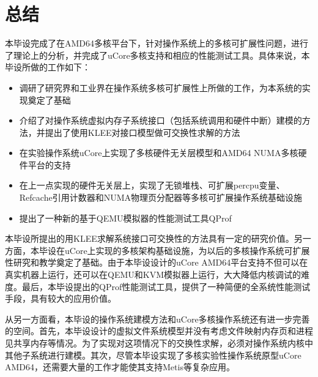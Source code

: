 
\chapter{总结}

本毕设完成了在AMD64多核平台下，针对操作系统上的多核可扩展性问题，进行了理论上的分析，并完成了uCore多核支持和相应的性能测试工具。具体来说，本毕设所做的工作如下：

\begin{itemize}
	\item
	调研了研究界和工业界在操作系统多核可扩展性上所做的工作，为本系统的实现奠定了基础
	\item
	介绍了对操作系统虚拟内存子系统接口（包括系统调用和硬件中断）建模的方法，并提出了使用KLEE对接口模型做可交换性求解的方法
	\item 在实验操作系统uCore上实现了多核硬件无关层模型和AMD64 NUMA多核硬件平台的支持
	\item
	在上一点实现的硬件无关层上，实现了无锁堆栈、可扩展percpu变量、Refcache引用计数器和NUMA物理页分配器等多核可扩展操作系统基础设施
	\item 提出了一种新的基于QEMU模拟器的性能测试工具QProf
\end{itemize}

本毕设所提出的用KLEE求解系统接口可交换性的方法具有一定的研究价值。另一方面，本毕设在uCore上实现的多核架构基础设施，为以后的多核操作系统可扩展性研究和教学奠定了基础。由于本毕设设计的uCore
AMD64平台支持不但可以在真实机器上运行，还可以在QEMU和KVM模拟器上运行，大大降低内核调试的难度。最后，本毕设提出的QProf性能测试工具，提供了一种简便的全系统性能测试手段，具有较大的应用价值。

从另一方面看，本毕设的操作系统建模方法和uCore多核操作系统还有进一步完善的空间。首先，本毕设设计的虚拟文件系统模型并没有考虑文件映射内存页和进程见共享内存等情况。为了实现对这项情况下的交换性求解，必须对操作系统内核中其他子系统进行建模。其次，尽管本毕设实现了多核实验性操作系统原型uCore
AMD64，还需要大量的工作才能使其支持Metis\cite{linux:osdi10}等复杂应用。

